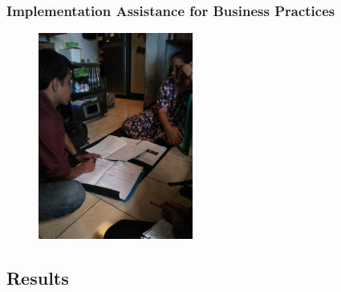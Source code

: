 \documentclass[hideothersubsections, usenames,dvipsnames,10pt]{beamer}
\begin{document}
\begin{frame}
\frametitle{Implementation Assistance for Business Practices}
\begin{figure}[htbp]
	\centering
		\includegraphics[width=2.0in]{pics/Assistance_expl.jpg}
	
	\label{height}
\end{figure}
\end{frame}


\subsection{Results}
\end{document}
